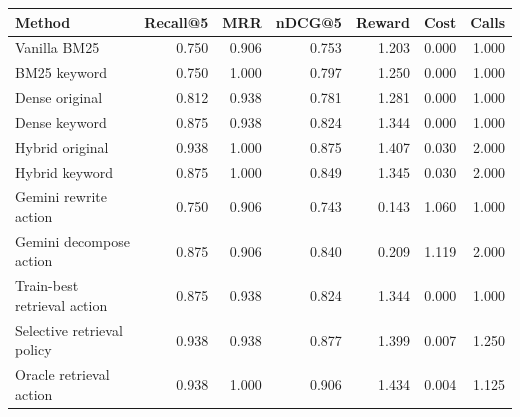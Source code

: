 \begin{tabular}{lrrrrrr}
\toprule
Method & Recall@5 & MRR & nDCG@5 & Reward & Cost & Calls \\
\midrule
Vanilla BM25 & 0.750 & 0.906 & 0.753 & 1.203 & 0.000 & 1.000 \\
BM25 keyword & 0.750 & 1.000 & 0.797 & 1.250 & 0.000 & 1.000 \\
Dense original & 0.812 & 0.938 & 0.781 & 1.281 & 0.000 & 1.000 \\
Dense keyword & 0.875 & 0.938 & 0.824 & 1.344 & 0.000 & 1.000 \\
Hybrid original & 0.938 & 1.000 & 0.875 & 1.407 & 0.030 & 2.000 \\
Hybrid keyword & 0.875 & 1.000 & 0.849 & 1.345 & 0.030 & 2.000 \\
Gemini rewrite action & 0.750 & 0.906 & 0.743 & 0.143 & 1.060 & 1.000 \\
Gemini decompose action & 0.875 & 0.906 & 0.840 & 0.209 & 1.119 & 2.000 \\
Train-best retrieval action & 0.875 & 0.938 & 0.824 & 1.344 & 0.000 & 1.000 \\
Selective retrieval policy & 0.938 & 0.938 & 0.877 & 1.399 & 0.007 & 1.250 \\
Oracle retrieval action & 0.938 & 1.000 & 0.906 & 1.434 & 0.004 & 1.125 \\
\bottomrule
\end{tabular}
